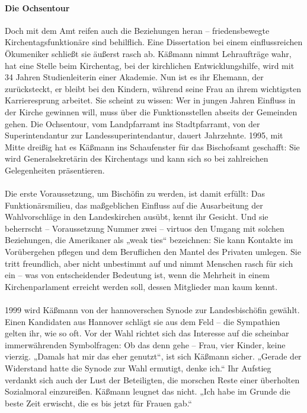 \documentclass[a4paper,12pt,twoside]{scrbook}
\begin{document}
\paragraph{Die Ochsentour}
Doch mit dem Amt reifen auch die Beziehungen heran – friedensbewegte Kirchentagsfunktionäre sind behilflich. Eine Dissertation bei einem einflussreichen Ökumeniker schließt sie äußerst rasch ab. Käßmann nimmt Lehraufträge wahr, hat eine Stelle beim Kirchentag, bei der kirchlichen Entwicklungshilfe, wird mit 34 Jahren Studienleiterin einer Akademie. Nun ist es ihr Ehemann, der zurücksteckt, er bleibt bei den Kindern, während seine Frau an ihrem wichtigsten Karrieresprung arbeitet. Sie scheint zu wissen: Wer in jungen Jahren Einfluss in der Kirche gewinnen will, muss über die Funktionsstellen abseits der Gemeinden gehen. Die Ochsentour, vom Landpfarramt ins Stadtpfarramt, von der Superintendantur zur Landessuperintendantur, dauert Jahrzehnte. 1995, mit Mitte dreißig hat es Käßmann ins Schaufenster für das Bischofsamt geschafft: Sie wird Generalsekretärin des Kirchentags und kann sich so bei zahlreichen Gelegenheiten präsentieren.
\\\\
Die erste Voraussetzung, um Bischöfin zu werden, ist damit erfüllt: Das Funktionärsmilieu, das maßgeblichen Einfluss auf die Ausarbeitung der Wahlvorschläge in den Landeskirchen ausübt, kennt ihr Gesicht. Und sie beherrscht – Voraussetzung Nummer zwei – virtuos den Umgang mit solchen Beziehungen, die Amerikaner als „weak ties“ bezeichnen: Sie kann Kontakte im Vorübergehen pflegen und dem Beruflichen den Mantel des Privaten umlegen. Sie tritt freundlich, aber nicht unbestimmt auf und nimmt Menschen rasch für sich ein – was von entscheidender Bedeutung ist, wenn die Mehrheit in einem Kirchenparlament erreicht werden soll, dessen Mitglieder man kaum kennt.
\\\\
1999 wird Käßmann von der hannoverschen Synode zur Landesbischöfin gewählt. Einen Kandidaten aus Hannover schlägt sie aus dem Feld – die Sympathien gelten ihr, wie so oft. Vor der Wahl richtet sich das Interesse auf die scheinbar immerwährenden Symbolfragen: Ob das denn gehe – Frau, vier Kinder, keine vierzig. „Damals hat mir das eher genutzt“, ist sich Käßmann sicher. „Gerade der Widerstand hatte die Synode zur Wahl ermutigt, denke ich.“ Ihr Aufstieg verdankt sich auch der Lust der Beteiligten, die morschen Reste einer überholten Sozialmoral einzureißen. Käßmann leugnet das nicht. „Ich habe im Grunde die beste Zeit erwischt, die es bis jetzt für Frauen gab.“
\end{document}
